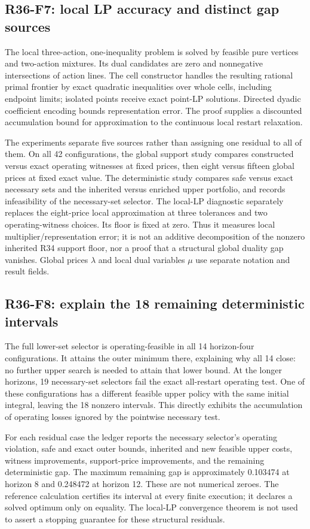 \subsection{R36-F7: local LP accuracy and distinct gap sources}
The local three-action, one-inequality problem is solved by feasible pure vertices and two-action mixtures. Its dual candidates are zero and nonnegative intersections of action lines. The cell constructor handles the resulting rational primal frontier by exact quadratic inequalities over whole cells, including endpoint limits; isolated points receive exact point-LP solutions. Directed dyadic coefficient encoding bounds representation error. The proof supplies a discounted accumulation bound for approximation to the continuous local restart relaxation.

The experiments separate five sources rather than assigning one residual to all of them. On all 42 configurations, the global support study compares constructed versus exact operating witnesses at fixed prices, then eight versus fifteen global prices at fixed exact value. The deterministic study compares safe versus exact necessary sets and the inherited versus enriched upper portfolio, and records infeasibility of the necessary-set selector. The local-LP diagnostic separately replaces the eight-price local approximation at three tolerances and two operating-witness choices. Its floor is fixed at zero. Thus it measures local multiplier/representation error; it is not an additive decomposition of the nonzero inherited R34 support floor, nor a proof that a structural global duality gap vanishes. Global prices $\lambda$ and local dual variables $\mu$ use separate notation and result fields.

\subsection{R36-F8: explain the 18 remaining deterministic intervals}
The full lower-set selector is operating-feasible in all 14 horizon-four configurations. It attains the outer minimum there, explaining why all 14 close: no further upper search is needed to attain that lower bound. At the longer horizons, 19 necessary-set selectors fail the exact all-restart operating test. One of these configurations has a different feasible upper policy with the same initial integral, leaving the 18 nonzero intervals. This directly exhibits the accumulation of operating losses ignored by the pointwise necessary test.

For each residual case the ledger reports the necessary selector's operating violation, safe and exact outer bounds, inherited and new feasible upper costs, witness improvements, support-price improvements, and the remaining deterministic gap. The maximum remaining gap is approximately 0.103474 at horizon 8 and 0.248472 at horizon 12. These are not numerical zeroes. The reference calculation certifies its interval at every finite execution; it declares a solved optimum only on equality. The local-LP convergence theorem is not used to assert a stopping guarantee for these structural residuals.

